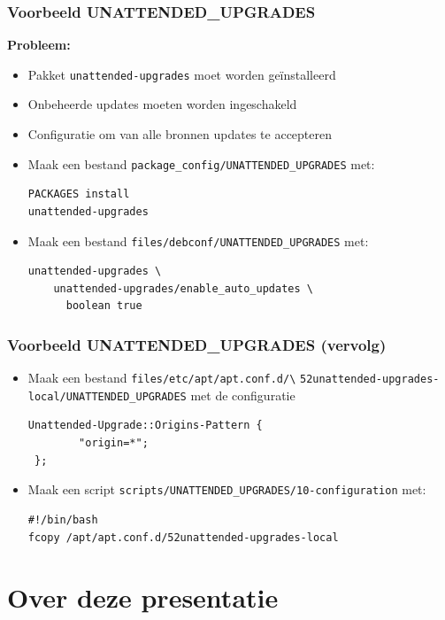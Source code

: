 \documentclass{beamer}
\begin{document}
\begin{frame}[fragile]
\frametitle{Voorbeeld UNATTENDED\_UPGRADES}
 
\textbf{Probleem:} 
\begin{itemize}
  \item Pakket \texttt{unattended-upgrades} moet worden geïnstalleerd
  \item Onbeheerde updates moeten worden ingeschakeld
  \item Configuratie om van alle bronnen updates te accepteren
\end{itemize}

\begin{itemize}
  \item<2-> Maak een bestand \texttt{package\_config/UNATTENDED\_UPGRADES} met:
  \begin{verbatim}PACKAGES install
unattended-upgrades
  \end{verbatim} 
  \item<3-> Maak een bestand \texttt{files/debconf/UNATTENDED\_UPGRADES} met:
  \begin{verbatim}unattended-upgrades \
    unattended-upgrades/enable_auto_updates \
      boolean true
  \end{verbatim}
\end{itemize}
\end{frame}

\begin{frame}[fragile]
\frametitle{Voorbeeld UNATTENDED\_UPGRADES (vervolg)}
\begin{itemize}
  \item<2-> Maak een bestand \texttt{files/etc/apt/apt.conf.d/\textbackslash} \texttt{52unattended-upgrades-local/UNATTENDED\_UPGRADES} met de configuratie
  \begin{verbatim}Unattended-Upgrade::Origins-Pattern {
        "origin=*";
 };
  \end{verbatim}
  \item<3-> Maak een script \texttt{scripts/UNATTENDED\_UPGRADES/10-configuration} met:
  \begin{verbatim}#!/bin/bash
fcopy /apt/apt.conf.d/52unattended-upgrades-local
  \end{verbatim}
   
\end{itemize}
\end{frame}

\section{Over deze presentatie}
\end{document}

